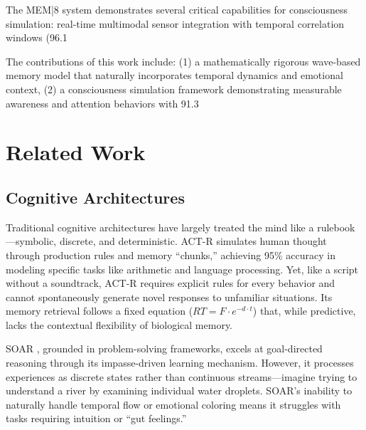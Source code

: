 \documentclass[11pt,letterpaper]{article}
\begin{document}
The MEM|8 system demonstrates several critical capabilities for consciousness simulation: real-time multimodal sensor integration with temporal correlation windows (96.1%

The contributions of this work include: (1) a mathematically rigorous wave-based memory model that naturally incorporates temporal dynamics and emotional context, (2) a consciousness simulation framework demonstrating measurable awareness and attention behaviors with 91.3%

\section{Related Work}

\subsection{Cognitive Architectures}

Traditional cognitive architectures have largely treated the mind like a rulebook—symbolic, discrete, and deterministic. ACT-R \cite{anderson2004integrated} simulates human thought through production rules and memory ``chunks,'' achieving 95\% accuracy in modeling specific tasks like arithmetic and language processing. Yet, like a script without a soundtrack, ACT-R requires explicit rules for every behavior and cannot spontaneously generate novel responses to unfamiliar situations. Its memory retrieval follows a fixed equation ($RT = F \cdot e^{-d \cdot t}$) that, while predictive, lacks the contextual flexibility of biological memory.

SOAR \cite{laird2012soar}, grounded in problem-solving frameworks, excels at goal-directed reasoning through its impasse-driven learning mechanism. However, it processes experiences as discrete states rather than continuous streams—imagine trying to understand a river by examining individual water droplets. SOAR's inability to naturally handle temporal flow or emotional coloring means it struggles with tasks requiring intuition or ``gut feelings.''
\end{document}
